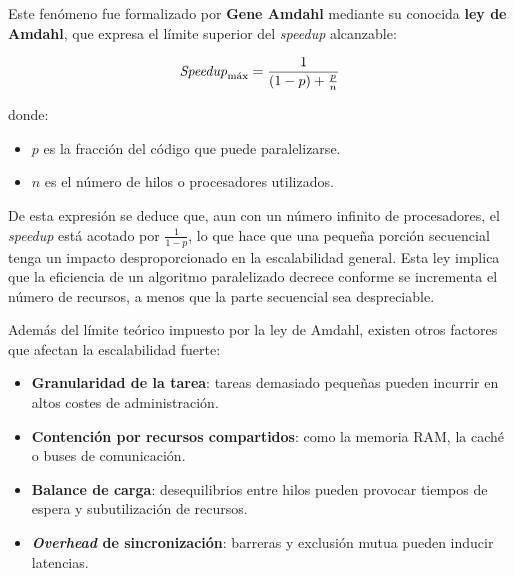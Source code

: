             Este fenómeno fue formalizado por \textbf{Gene Amdahl} mediante su conocida \textbf{ley de Amdahl}, que expresa el límite superior del \textit{speedup} alcanzable:
            
            \begin{align}
                \text{\textit{Speedup}}_{\text{máx}} = \frac{1}{(1 - p) + \frac{p}{n}}
            \end{align}

            donde:

            \begin{itemize}
            
                \item $p$ es la fracción del código que puede paralelizarse.
                
                \item $n$ es el número de hilos o procesadores utilizados.
                
            \end{itemize}

            De esta expresión se deduce que, aun con un número infinito de procesadores, el \textit{speedup} está acotado por $\frac{1}{1 - p}$, lo que hace que una pequeña porción secuencial tenga un impacto desproporcionado en la escalabilidad general. Esta ley implica que la eficiencia de un algoritmo paralelizado decrece conforme se incrementa el número de recursos, a menos que la parte secuencial sea despreciable.
            
            Además del límite teórico impuesto por la ley de Amdahl, existen otros factores que afectan la escalabilidad fuerte:
            
            \begin{itemize}
            
                \item \textbf{Granularidad de la tarea}: tareas demasiado pequeñas pueden incurrir en altos costes de administración.
                
                \item \textbf{Contención por recursos compartidos}: como la memoria RAM, la caché o buses de comunicación.
                
                \item \textbf{Balance de carga}: desequilibrios entre hilos pueden provocar tiempos de espera y subutilización de recursos.
                
                \item \textbf{\textit{Overhead} de sincronización}: barreras y exclusión mutua pueden inducir latencias.
                
            \end{itemize}

